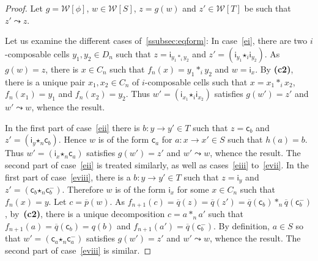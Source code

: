 \documentclass[reqno]{amsart}
\theoremstyle{plain}
\theoremstyle{definition}
\theoremstyle{remark}
\newcommand{\comp}[1]{\ast_{#1}} %
\newcommand{\WW}{\mathcal{W}}
\newcommand{\wtx}[1]{\WW[#1]} %
\newcommand{\formal}[1]{\mathsf{#1}} %
\newcommand{\fcst}[1]{\formal{c}_{#1}} %
\newcommand{\finv}[1]{\formal{c}^{\boldsymbol{-}}_{#1}}%
\newcommand{\fid}[1]{\formal{i}_{#1}} %
\newcommand{\fcomp}[1]{\bm{\star}_{#1}} %
\newcommand{\frel}{\leadsto} %
\newcommand{\extend}[1]{\overline{#1}} %
\newcommand{\cndii}{\textbf{(c2)}} %
\begin{document}
\begin{proof}
  Let $g=\wtx\phi$, $w\in\wtx S$, $z=g(w)$ and $z'\in\wtx T$ be such that
  $z'\frel z$.

  Let us examine the different cases of~\ref{ssubsec:eqform}: In
  case~\ref{ei}, there are two $i$-composable cells $y_1,y_2\in D_n$ such that
  $z=\fid{y_1\comp i y_2}$ and $z'=(\fid{y_1}\fcomp i \fid{y_2})$. As
  $g(w)=z$, there is $x\in C_n$ such that $f_n(x)=y_1\comp i y_2$ and
  $w=\fid{x}$. By \cndii, there is a unique pair
  $x_1,x_2\in C_n$ of $i$-composable cells such that $x=x_1\comp i
  x_2$, $f_n(x_1)=y_1$ and $f_n(x_2)=y_2$. Thus $w'=(\fid{x_1}\fcomp
  i\fid{x_2})$ satisfies $g(w')=z'$ and $w'\frel w$, whence the
  result.

  In the first part of case~\ref{eii}  there is $b:y\to y'\in T$ such that
  $z=\fcst b$ and $z'=(\fid y\fcomp n
\fcst b)$. Hence $w$ is of the form $\fcst a$ for
$a:x\to x'\in S$ such that $h(a)=b$. Thus $w'=(\fid{x}\fcomp n \fcst
a)$ satisfies $g(w')=z'$ and $w'\frel w$, whence the result.
The second part of case~\ref{eii} is treated similarly, as well as
cases~\ref{eiii} to~\ref{evii}.
In the first part of
   case~\ref{eviii}, there is a $b:y\to y'\in T$ such that $z=\fid{y}$ and $z'=(\fcst b\fcomp
   n\finv b)$. Therefore $w$ is of the form $\fid x$ for some $x\in
   C_n$ such that $f_n(x)=y$. Let $c=\extend p(w)$. As
   $f_{n+1}(c)=\extend q(z)=\extend q(z')=\extend q(\fcst b)\comp n
   \extend q(\finv b)$, by~\cndii, there is a unique
   decomposition $c=a\comp n a'$ such that $f_{n+1}(a)=\extend
   q(\fcst b)=q(b)$ and $f_{n+1}(a')=\extend q(\finv b)$. By
   definition, $a\in S$ so that $w'=(\fcst a\fcomp n\finv a)$ satisfies
   $g(w')=z'$ and $w'\frel w$, whence the result. The second part of
   case~\ref{eviii} is similar.
 \end{proof}
\end{document}
